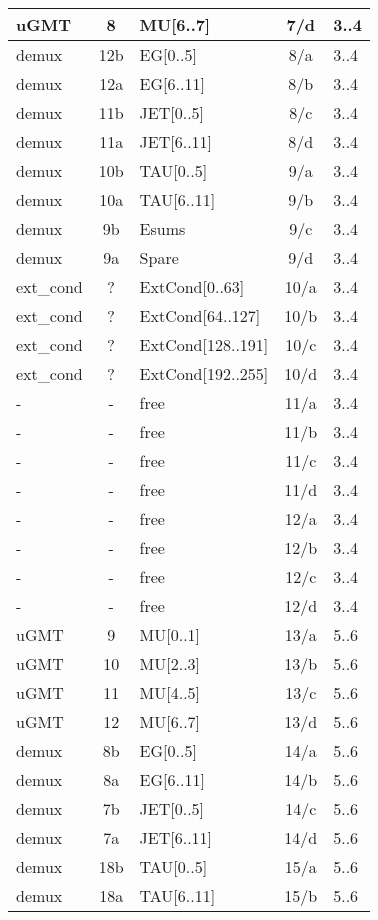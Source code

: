 \begin{longtable}{|l|c|l|c|l|}
uGMT  & 8   & MU[6..7]   & 7/d  & 3..4 \\\hline
demux & 12b & EG[0..5]   & 8/a  & 3..4 \\\hline
demux & 12a & EG[6..11]  & 8/b  & 3..4 \\\hline
demux & 11b & JET[0..5]  & 8/c  & 3..4 \\\hline
demux & 11a & JET[6..11] & 8/d  & 3..4 \\\hline
demux & 10b & TAU[0..5]  & 9/a  & 3..4 \\\hline
demux & 10a & TAU[6..11] & 9/b  & 3..4 \\\hline
demux & 9b  & Esums      & 9/c  & 3..4 \\\hline
demux & 9a  & Spare      & 9/d  & 3..4 \\\hline
ext\_cond & ?   & ExtCond[0..63]    & 10/a & 3..4 \\\hline
ext\_cond & ?   & ExtCond[64..127]  & 10/b & 3..4 \\\hline
ext\_cond & ?   & ExtCond[128..191] & 10/c & 3..4 \\\hline
ext\_cond & ?   & ExtCond[192..255] & 10/d & 3..4 \\\hline
- & - & free & 11/a & 3..4 \\\hline
- & - & free & 11/b & 3..4 \\\hline
- & - & free & 11/c & 3..4 \\\hline
- & - & free & 11/d & 3..4 \\\hline
- & - & free & 12/a & 3..4 \\\hline
- & - & free & 12/b & 3..4 \\\hline
- & - & free & 12/c & 3..4 \\\hline
- & - & free & 12/d & 3..4 \\\hline
\hline
uGMT  & 9   & MU[0..1]   & 13/a & 5..6 \\\hline
uGMT  & 10  & MU[2..3]   & 13/b & 5..6 \\\hline
uGMT  & 11  & MU[4..5]   & 13/c & 5..6 \\\hline
uGMT  & 12  & MU[6..7]   & 13/d & 5..6 \\\hline
demux & 8b  & EG[0..5]   & 14/a & 5..6 \\\hline
demux & 8a  & EG[6..11]  & 14/b & 5..6 \\\hline
demux & 7b  & JET[0..5]  & 14/c & 5..6 \\\hline
demux & 7a  & JET[6..11] & 14/d & 5..6 \\\hline
demux & 18b & TAU[0..5]  & 15/a & 5..6 \\\hline
demux & 18a & TAU[6..11] & 15/b & 5..6 \\\hline

\end{longtable}

